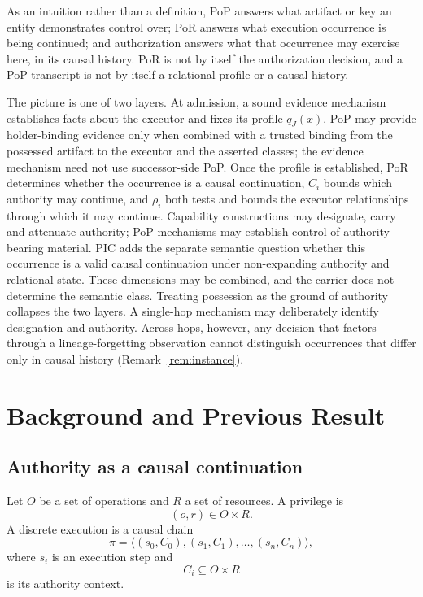 \documentclass[10pt,twocolumn]{article}
\begin{document}
As an intuition rather than a definition, PoP answers what artifact or key an
entity demonstrates control over; PoR answers what execution occurrence is
being continued; and authorization answers what that occurrence may exercise
here, in its causal history. PoR is not by itself the authorization decision,
and a PoP transcript is not by itself a relational profile or a causal history.

The picture is one of two layers. At admission, a sound evidence mechanism
establishes facts about the executor and fixes its profile \(q_J(x)\). PoP may
provide holder-binding evidence only when combined with a trusted binding from
the possessed artifact to the executor and the asserted classes; the evidence
mechanism need not use successor-side PoP. Once the profile is established,
PoR determines whether the occurrence is a causal continuation, \(C_i\) bounds
which authority may continue, and \(\rho_i\) both tests and bounds the executor
relationships through which it may continue.
Capability constructions may designate, carry and attenuate authority; PoP
mechanisms may establish control of authority-bearing material. PIC adds the
separate semantic question whether this occurrence is a valid causal
continuation under non-expanding authority and relational state. These
dimensions may be combined, and the carrier does not determine the semantic
class.
Treating possession as the ground of authority collapses the two layers. A
single-hop mechanism may deliberately identify designation and authority.
Across hops, however, any decision that factors through a lineage-forgetting
observation cannot distinguish occurrences that differ only in causal history
(Remark~\ref{rem:instance}).

\section{Background and Previous Result}

\subsection{Authority as a causal continuation}

Let \(O\) be a set of operations and \(R\) a set of resources. A privilege is
\[
(o,r)\in O\times R.
\]
A discrete execution is a causal chain
\[
\pi=\langle (s_0,C_0),(s_1,C_1),\ldots,(s_n,C_n)\rangle,
\]
where \(s_i\) is an execution step and
\[
C_i\subseteq O\times R
\]
is its authority context.
\end{document}

